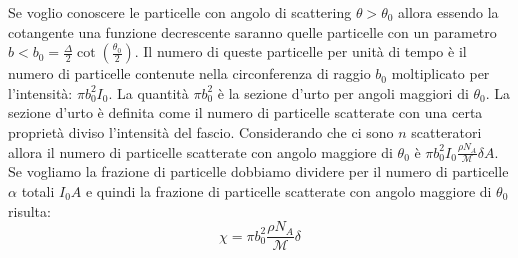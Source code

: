 Se voglio conoscere le particelle con angolo di scattering $\theta>\theta_0$ allora essendo la cotangente una funzione decrescente saranno quelle particelle con un parametro $b<b_0=\frac{\Delta}{2}\cot\left(\frac{\theta_0}{2}\right)$. Il numero di queste particelle per unità di tempo è il numero di particelle contenute nella circonferenza di raggio $b_0$ moltiplicato per l'intensità: $\pi b_0^2I_0$. La quantità $\pi b_0^2$ è la sezione d'urto per angoli maggiori di $\theta_0$. La sezione d'urto è definita come il numero di particelle scatterate con una certa proprietà diviso l'intensità del fascio. Considerando che ci sono $n$ scatteratori allora il numero di particelle scatterate con angolo maggiore di $\theta_0$ è $\pi b_0^2I_0\frac{\rho N_A}{\mathcal{M}}\delta A$. Se vogliamo la frazione di particelle dobbiamo dividere per il numero di particelle $\alpha$ totali $I_0A$ e quindi la frazione di particelle scatterate con angolo maggiore di $\theta_0$ risulta:
\begin{equation}
\chi=\pi b_0^2\frac{\rho N_A}{\mathcal{M}}\delta
\end{equation}
